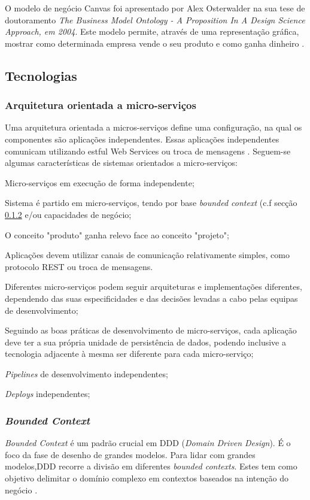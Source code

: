 O modelo de negócio Canvas foi apresentado por Alex Osterwalder na sua tese de doutoramento \emph{The Business Model Ontology - A Proposition In A Design Science Approach, em 2004}. Este modelo permite, através de uma representação gráfica, mostrar como determinada empresa vende o seu produto  e como ganha dinheiro \cite{canvas}.

\subsection{Tecnologias}

\subsubsection{Arquitetura orientada a micro-serviços}
Uma arquitetura orientada a micros-serviços define uma configuração, na qual os componentes são aplicações independentes. Essas aplicações independentes comunicam utilizando estful Web Services ou troca de mensagens \cite{microservices}.
Seguem-se algumas características de sistemas orientados a micro-serviços:
\begin{description}
\item Micro-serviços em execução de forma independente;
\item Sistema é partido em micro-serviços, tendo por base \emph{bounded context} (c.f secção \ref{subsubsection:bounded:context} e/ou capacidades de negócio;
\item O conceito "produto" ganha relevo face ao conceito "projeto";
\item Aplicações devem utilizar canais de comunicação relativamente simples, como protocolo REST ou troca de mensagens.
\item Diferentes micro-serviços podem seguir arquiteturas e implementações diferentes, dependendo das suas especificidades e das decisões levadas a cabo pelas equipas de desenvolvimento;
\item Seguindo as boas práticas de desenvolvimento de micro-serviços, cada aplicação deve ter a sua própria unidade de persistência de dados, podendo inclusive a tecnologia adjacente à mesma ser diferente para cada micro-serviço;
\item \emph{Pipelines} de desenvolvimento independentes;
\item \emph{Deploys} independentes;
\end{description}

\subsubsection{\emph{Bounded Context}} \label{subsubsection:bounded:context}
\emph{Bounded Context} é um padrão crucial em DDD (\emph{Domain Driven Design}). É o foco da fase de desenho de grandes modelos. Para lidar com grandes modelos,DDD recorre a divisão em diferentes \emph{bounded contexts}. Estes tem como objetivo delimitar o domínio complexo em contextos baseados na intenção do negócio \cite{bounded_context}.

